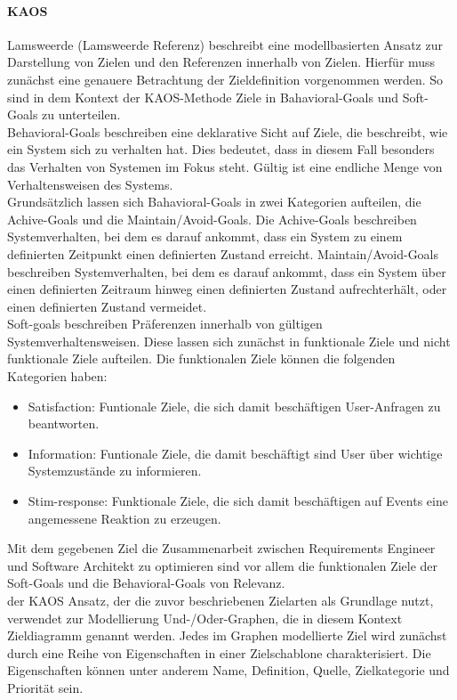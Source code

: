 \paragraph{KAOS}
Lamsweerde (Lamsweerde Referenz) beschreibt eine modellbasierten Ansatz zur Darstellung von Zielen und den Referenzen innerhalb von Zielen. Hierf\"ur muss zun\"achst eine genauere Betrachtung der Zieldefinition vorgenommen werden. So sind in dem Kontext der KAOS-Methode Ziele in Bahavioral-Goals und Soft-Goals zu unterteilen. \\
Behavioral-Goals beschreiben eine deklarative Sicht auf Ziele, die beschreibt, wie ein System sich zu verhalten hat. Dies bedeutet, dass in diesem Fall besonders das Verhalten von Systemen im Fokus steht. G\"ultig ist eine endliche Menge von Verhaltensweisen des Systems. \\
Grunds\"atzlich lassen sich Bahavioral-Goals in zwei Kategorien aufteilen, die Achive-Goals und die Maintain/Avoid-Goals. Die Achive-Goals beschreiben Systemverhalten, bei dem es darauf ankommt, dass ein System zu einem definierten Zeitpunkt einen definierten Zustand erreicht. Maintain/Avoid-Goals beschreiben Systemverhalten, bei dem es darauf ankommt, dass ein System \"uber einen definierten Zeitraum hinweg einen definierten Zustand aufrechterh\"alt, oder einen definierten Zustand vermeidet.\\
Soft-goals beschreiben Pr\"aferenzen innerhalb von g\"ultigen Systemverhaltensweisen. Diese lassen sich zun\"achst in funktionale Ziele und nicht funktionale Ziele aufteilen. Die funktionalen Ziele k\"onnen die folgenden Kategorien haben:
\begin{itemize}
\item Satisfaction: Funtionale Ziele, die sich damit besch\"aftigen User-Anfragen zu beantworten.
\item Information: Funtionale Ziele, die damit besch\"aftigt sind User \"uber wichtige Systemzust\"ande zu informieren.
\item Stim-response: Funktionale Ziele, die sich damit besch\"aftigen auf Events eine angemessene Reaktion zu erzeugen.
\end{itemize}
Mit dem gegebenen Ziel die Zusammenarbeit zwischen Requirements Engineer und Software Architekt zu optimieren sind vor allem die funktionalen Ziele der Soft-Goals und die Behavioral-Goals von Relevanz.\\
der KAOS Ansatz, der die zuvor beschriebenen Zielarten als Grundlage nutzt, verwendet zur Modellierung Und-/Oder-Graphen, die in diesem Kontext Zieldiagramm genannt werden. Jedes im Graphen modellierte Ziel wird zun\"achst durch eine Reihe von Eigenschaften in einer Zielschablone charakterisiert. Die Eigenschaften k\"onnen unter anderem Name, Definition, Quelle, Zielkategorie und Priorit\"at sein.\\

